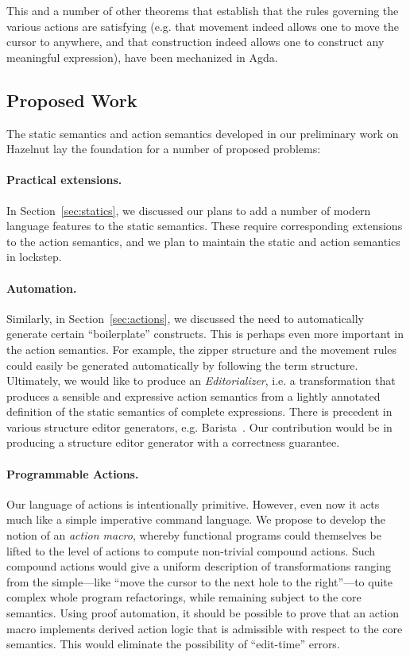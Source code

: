 This and a number of other theorems that establish that the rules governing
the various actions are satisfying (e.g. that movement indeed allows one 
to move the cursor to anywhere, and that construction indeed allows one 
to construct any meaningful expression), have been mechanized in Agda.




\subsection{Proposed Work}
The static semantics and action semantics developed in our preliminary work on Hazelnut lay the foundation for a number of proposed problems:

\paragraph{Practical extensions.} In Section~\ref{sec:statics}, we
discussed our plans to add a number of modern language features to the static
semantics. These require corresponding extensions to the action semantics, and
we plan to maintain the static and action semantics in lockstep. 

\paragraph{Automation.} Similarly, in Section~\ref{sec:actions}, we
discussed the need to automatically generate certain ``boilerplate''
constructs. This is perhaps even more important in the action semantics. For
example, the zipper structure and the movement rules could easily be generated
automatically by following the term structure. Ultimately, we would like to
produce an \emph{Editorializer}, i.e. a transformation that produces a sensible
and expressive action semantics from a lightly annotated definition of the
static semantics of complete expressions. There is precedent in various
structure editor generators, e.g. Barista~\citep{ko_barista:_2006}. Our
contribution would be in producing a structure editor generator with a
correctness guarantee. 

\paragraph{Programmable Actions.} Our language of actions is intentionally primitive. However, even now it
acts much like a simple imperative command language. We propose to develop the
notion of an \emph{action macro}, whereby 
functional programs could themselves be lifted to the level of actions to
compute non-trivial compound actions. Such compound actions would give a
uniform description of transformations ranging from the simple---like
``move the cursor to the next hole to the right''---to quite complex whole
program refactorings, while remaining subject to the core semantics. Using proof automation, it should be possible to prove that an action macro implements derived action logic that 
is admissible with respect to the core semantics. This would eliminate the possibility of ``edit-time'' errors.

